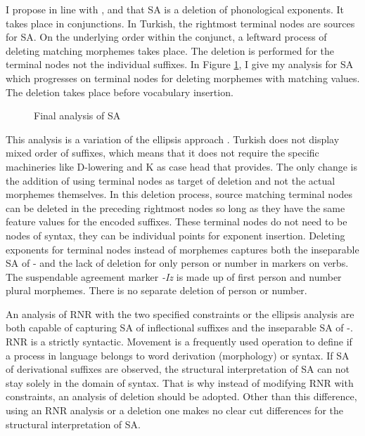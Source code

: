 I propose in line with \cite{guseva2017postsyntactic}, and \cite{erschler2018suspended} that SA is a deletion of phonological exponents. It takes place in conjunctions. In Turkish, the rightmost terminal nodes are sources for SA. On the underlying order within the conjunct, a leftward process of deleting matching morphemes takes place. The deletion is performed for the terminal nodes not the individual suffixes. In Figure \ref{fig:myanalysis}, I give my analysis for SA which progresses on terminal nodes for deleting morphemes with matching values. The deletion takes place before vocabulary insertion.

\begin{figure}[hbt!]
    \centering
    \caption{Final analysis of SA}
    \label{fig:myanalysis}
\end{figure}

This analysis is a variation of the ellipsis approach \citep{guseva2017postsyntactic,erschler2018suspended}. Turkish does not display mixed order of suffixes, which means that it does not require the specific machineries like D-lowering and K as case head that \cite{guseva2017postsyntactic} provides. The only change is the addition of using terminal nodes as target of deletion and not the actual morphemes themselves. In this deletion process, source matching terminal nodes can be deleted in the preceding rightmost nodes so long as they have the same feature values for the encoded suffixes. These terminal nodes do not need to be nodes of syntax, they can be individual points for exponent insertion. Deleting exponents for terminal nodes instead of morphemes captures both the inseparable SA of {\Pl-\Poss} and the lack of deletion for only person or number in {\Agr} markers on verbs. The suspendable agreement marker \textit{-Iz} is made up of first person and number plural morphemes. There is no separate deletion of person or number.


An analysis of RNR with the two specified constraints or the ellipsis analysis are both capable of capturing SA of inflectional suffixes and the inseparable SA of {\Pl-\Poss}. RNR is a strictly syntactic. Movement is a frequently used operation to define if a process in language belongs to word derivation (morphology) or syntax. If SA of derivational suffixes are observed, the structural interpretation of SA can not stay solely in the domain of syntax. That is why instead of modifying RNR with constraints, an analysis of deletion should be adopted. Other than this difference, using an RNR analysis or a deletion one makes no clear cut differences for the structural interpretation of SA.


